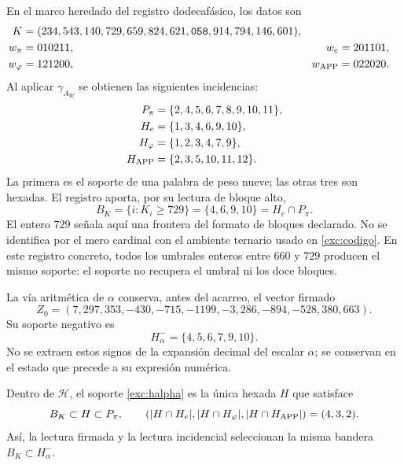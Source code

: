 En el marco heredado del registro dodecafásico, los datos son
\begin{align}
 K={}&(234,543,140,729,659,824,621,\mathtt{058},914,794,146,601),
 \label{exc:k}\\
 w_\pi={}&010211, &w_e={}&201101,\nonumber\\
 w_\varphi={}&121200, &w_{\rm APP}={}&022020.\nonumber
\end{align}
Al aplicar $\gamma_{A_W}$ se obtienen las siguientes incidencias:
\begin{align*}
 P_\pi&=\{2,4,5,6,7,8,9,10,11\},\\
 H_e&=\{1,3,4,6,9,10\},\\
 H_\varphi&=\{1,2,3,4,7,9\},\\
 H_{\rm APP}&=\{2,3,5,10,11,12\}.
\end{align*}
La primera es el soporte de una palabra de peso nueve; las otras tres
son hexadas. El registro aporta, por su lectura de bloque alto,
\begin{equation}
 B_K=\{i:K_i\geq729\}=\{4,6,9,10\}=H_e\cap P_\pi.
 \label{exc:bk}
\end{equation}
El entero $729$ señala aquí una frontera del formato de bloques
declarado. No se identifica por el mero cardinal con el ambiente
ternario usado en \eqref{exc:codigo}. En este registro concreto, todos
los umbrales enteros entre $660$ y $729$ producen el mismo soporte:
el soporte no recupera el umbral ni los doce bloques.

La vía aritmética de $\alpha$ conserva, antes del acarreo, el vector
firmado
\begin{equation}
 Z_0=(7,297,353,-430,-715,-1199,-3,286,-894,-528,380,663).
 \label{exc:precarry}
\end{equation}
Su soporte negativo es
\begin{equation}
 H^-_\alpha=\{4,5,6,7,9,10\}.
 \label{exc:halpha}
\end{equation}
No se extraen estos signos de la expansión decimal del escalar
$\alpha$; se conservan en el estado que precede a su expresión numérica.



\begin{proposition}
\label{exc:selector-bandera}
Dentro de $\mathcal H$, el soporte \eqref{exc:halpha} es la única hexada
$H$ que satisface
\[
 B_K\subset H\subset P_\pi,
 \qquad
 (|H\cap H_e|,|H\cap H_\varphi|,|H\cap H_{\rm APP}|)=(4,3,2).
\]
Así, la lectura firmada y la lectura incidencial seleccionan la misma
bandera $B_K\subset H^-_\alpha$.
\end{proposition}


